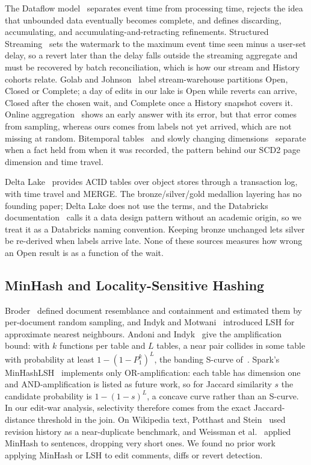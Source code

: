 The Dataflow model~\cite{S20_akidau2015} separates event time from processing time, rejects the idea that unbounded data eventually becomes complete, and defines discarding, accumulating, and accumulating-and-retracting refinements. Structured Streaming~\cite{S16_armbrust2018} sets the watermark to the maximum event time seen minus a user-set delay, so a revert later than the delay falls outside the streaming aggregate and must be recovered by batch reconciliation, which is how our stream and History cohorts relate. Golab and Johnson~\cite{S26_golab2011} label stream-warehouse partitions Open, Closed or Complete; a day of edits in our lake is Open while reverts can arrive, Closed after the chosen wait, and Complete once a History snapshot covers it. Online aggregation~\cite{S29_hellerstein1997} shows an early answer with its error, but that error comes from sampling, whereas ours comes from labels not yet arrived, which are not missing at random. Bitemporal tables~\cite{S27_snodgrass} and slowly changing dimensions~\cite{S28_kimball2013} separate when a fact held from when it was recorded, the pattern behind our SCD2 page dimension and time travel.

Delta Lake~\cite{S23_armbrust2020} provides ACID tables over object stores through a transaction log, with time travel and MERGE. The bronze/silver/gold medallion layering has no founding paper; Delta Lake does not use the terms, and the Databricks documentation~\cite{S25_databricksmedallion} calls it a data design pattern without an academic origin, so we treat it as a Databricks naming convention. Keeping bronze unchanged lets silver be re-derived when labels arrive late. None of these sources measures how wrong an Open result is as a function of the wait.

\subsection{MinHash and Locality-Sensitive Hashing}

Broder~\cite{L01_broder1997} defined document resemblance and containment and estimated them by per-document random sampling, and Indyk and Motwani~\cite{L04_indyk1998} introduced LSH for approximate nearest neighbours. Andoni and Indyk~\cite{L08_andoni2008} give the amplification bound: with $k$ functions per table and $L$ tables, a near pair collides in some table with probability at least $1-(1-P_1^{k})^{L}$, the banding S-curve of~\cite{S12_leskovec2020}. Spark's MinHashLSH~\cite{L17_sparklshguide} implements only OR-amplification: each table has dimension one and AND-amplification is listed as future work, so for Jaccard similarity $s$ the candidate probability is $1-(1-s)^{L}$, a concave curve rather than an S-curve. In our edit-war analysis, selectivity therefore comes from the exact Jaccard-distance threshold in the join. On Wikipedia text, Potthast and Stein~\cite{L18_potthast2008} used revision history as a near-duplicate benchmark, and Weissman et al.~\cite{L19_weissman2015} applied MinHash to sentences, dropping very short ones. We found no prior work applying MinHash or LSH to edit comments, diffs or revert detection.

